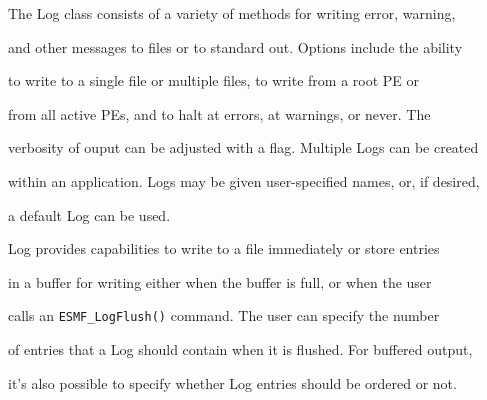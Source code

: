
%













The Log class consists of a variety of methods for writing error, warning, 

and other messages to files or to standard out.  Options include the ability 

to write to a single file or multiple files, to write from a root PE or 

from all active PEs, and to halt at errors, at warnings, or never.  The 

verbosity of ouput can be adjusted with a flag.  Multiple Logs can be created 

within an application.  Logs may be given user-specified names, or, if desired, 

a default Log can be used.  



Log provides capabilities to write to a file immediately or store entries 

in a buffer for writing either when the buffer is full, or when the user

calls an {\tt ESMF\_LogFlush()} command.  The user can specify the number 

of entries that a Log should contain when it is flushed.  For buffered output, 

it's also possible to specify whether Log entries should be ordered or not.  






